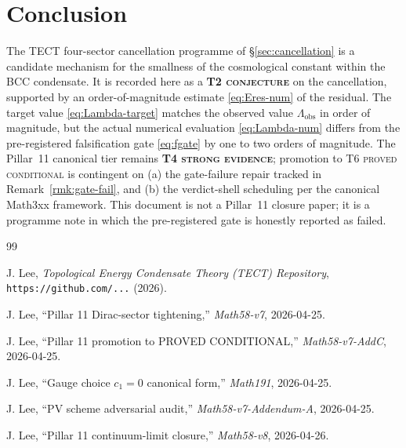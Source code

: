 \section{Conclusion}\label{sec:conclusion}

The TECT four-sector cancellation programme of \S\ref{sec:cancellation}
is a candidate mechanism for the smallness of the cosmological
constant within the BCC condensate. It is recorded here as a
\textbf{T2 \textsc{conjecture}} on the cancellation, supported by an
order-of-magnitude estimate \eqref{eq:Eres-num} of the residual. The
target value \eqref{eq:Lambda-target} matches the observed value
$\Lambda_{\mathrm{obs}}$ in order of magnitude, but the actual
numerical evaluation \eqref{eq:Lambda-num} differs from the
pre-registered falsification gate \eqref{eq:fgate} by one to two
orders of magnitude. The Pillar~11 canonical tier remains
\textbf{T4 \textsc{strong evidence}}; promotion to T6 \textsc{proved
conditional} is contingent on (a) the gate-failure repair tracked in
Remark~\ref{rmk:gate-fail}, and (b) the verdict-shell scheduling per
the canonical Math3xx framework. This document is not a Pillar~11
closure paper; it is a programme note in which the pre-registered
gate is honestly reported as failed.

\begin{thebibliography}{99}

J. Lee, \textit{Topological Energy Condensate Theory (TECT) Repository},
\texttt{https://github.com/...} (2026).

J. Lee, ``Pillar 11 Dirac-sector tightening,''
\textit{Math58-v7}, 2026-04-25.

J. Lee, ``Pillar 11 promotion to PROVED CONDITIONAL,''
\textit{Math58-v7-AddC}, 2026-04-25.

J. Lee, ``Gauge choice $c_1 = 0$ canonical form,''
\textit{Math191}, 2026-04-25.

J. Lee, ``PV scheme adversarial audit,''
\textit{Math58-v7-Addendum-A}, 2026-04-25.

J. Lee, ``Pillar 11 continuum-limit closure,''
\textit{Math58-v8}, 2026-04-26.

\end{thebibliography}



